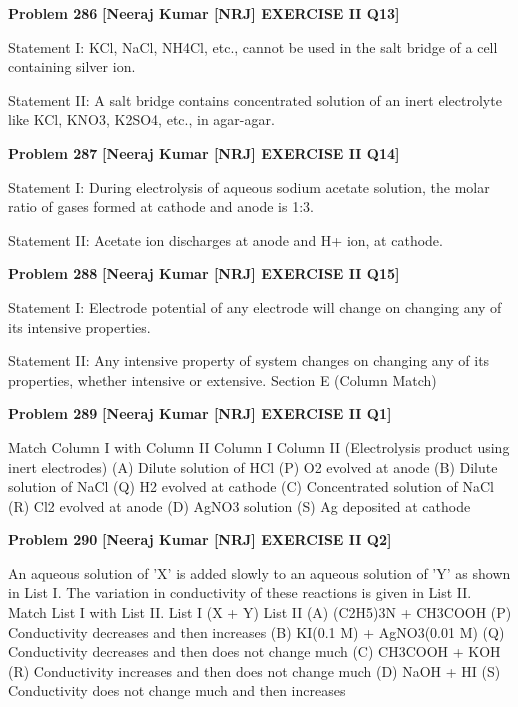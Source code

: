 \begin{problembox}
\textbf{Problem 286} \hfill \textbf{[Neeraj Kumar [NRJ] EXERCISE II Q13]}
\label{q:ext-nrj_all_questions-286}

Statement I: KCl, NaCl, NH4Cl, etc., cannot be 
used in the salt bridge of a cell containing silver ion.
 
 Statement II: A salt bridge contains concentrated 
solution of an inert electrolyte like KCl, KNO3, 
K2SO4, etc., in agar-agar.
\end{problembox}

\begin{problembox}
\textbf{Problem 287} \hfill \textbf{[Neeraj Kumar [NRJ] EXERCISE II Q14]}
\label{q:ext-nrj_all_questions-287}

Statement I: During electrolysis of aqueous 
sodium acetate solution, the molar ratio of gases 
formed at cathode and anode is 1:3.
 
 Statement II: Acetate ion discharges at anode and 
H+ ion, at cathode.
\end{problembox}

\begin{problembox}
\textbf{Problem 288} \hfill \textbf{[Neeraj Kumar [NRJ] EXERCISE II Q15]}
\label{q:ext-nrj_all_questions-288}

Statement I: Electrode potential of any electrode 
will change on changing any of its intensive 
properties.
 
 Statement II: Any intensive property of system 
changes on changing any of its properties, whether 
intensive or extensive.
Section E (Column Match)
\end{problembox}

\begin{problembox}
\textbf{Problem 289} \hfill \textbf{[Neeraj Kumar [NRJ] EXERCISE II Q1]}
\label{q:ext-nrj_all_questions-289}

Match Column I with Column II
Column I
Column II 
(Electrolysis product 
using inert electrodes)
(A)  Dilute solution of 
HCl
(P)  O2 evolved at anode
(B)  Dilute solution of 
NaCl
(Q)  H2 evolved at cathode
(C)  Concentrated 
solution of NaCl
(R)  Cl2 evolved at anode
(D)  AgNO3 solution
(S)  Ag deposited at cathode
\end{problembox}

\begin{problembox}
\textbf{Problem 290} \hfill \textbf{[Neeraj Kumar [NRJ] EXERCISE II Q2]}
\label{q:ext-nrj_all_questions-290}

An aqueous solution of 'X' is added slowly to an 
aqueous solution of 'Y' as shown in List I. The 
variation in conductivity of these reactions is 
given in List II. Match List I with List II.
List I  (X + Y)
List II
(A)  (C2H5)3N + 
CH3COOH
(P)  Conductivity decreases 
and then increases
(B)  KI(0.1 M) + 
AgNO3(0.01 M)
(Q)  Conductivity decreases 
and then does not change 
much
(C)  CH3COOH + 
KOH
(R)  Conductivity increases 
and then does not change 
much
(D)  NaOH + HI
(S)  Conductivity does not 
change much and then 
increases
\end{problembox}


